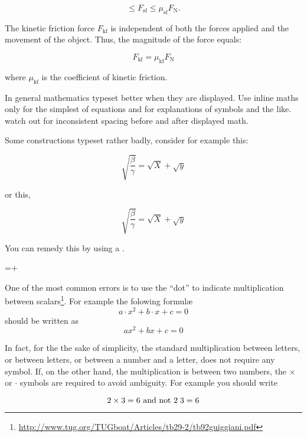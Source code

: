 {{\[ \le F_{\mathrm{sf}} \le \mu_{\mathrm{sf}} F_\mathrm{N}. \]

The kinetic friction force \(F_{\mathrm{kf}}\) is independent of both the forces applied and the movement of the object. Thus, the magnitude of the force equals:

\[F_{\mathrm{kf}} = \mu_{\mathrm{kf}} F_\mathrm{N}\]

where \(\mu_{\mathrm{kf}}\) is the coefficient of kinetic friction.
}






In general mathematics typeset better when they are displayed. Use inline maths only for the simplest of equations and for explanations of symbols and the like. watch out for inconsistent spacing before and after displayed math.


Some \tex constructions typeset rather badly, consider for example this:

\[
\sqrt{\frac{\beta}{\gamma}} = \sqrt{X} + \sqrt{y}
\]

\noindent or this,

\[
\surd{\frac{\beta}{\gamma}} = \surd{X} + \surd{y}
\]


You can remedy this by using a .


\begin{teXX}
=+
\end{teXX}


One of the most common errors is to use the ``dot'' to indicate multiplication between scalars\footnote{\url{http://www.tug.org/TUGboat/Articles/tb29-2/tb92guiggiani.pdf}}. For example the folowing formul\ae
\[a\cdot x^2+b\cdot x+c=0\]
should be written as
\[ax^2+bx+c=0\]

In fact, for the the sake of simplicity, the standard multiplication between letters, or between letters, or between a number and a letter, does not require any symbol. If, on the other hand, the multiplication is between two numbers, the $\times$ or $\cdot$ symbols are required to avoid ambiguity.
For example you should write

\[2\times 3=6 \text{ and not } 2\thickspace 3=6 \]


}
